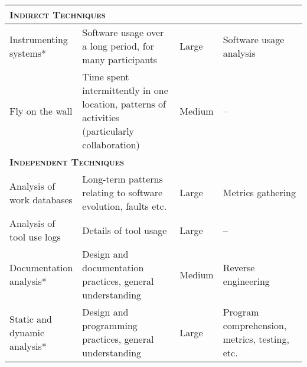 {\begin{landscape}
\begin{table}
{\begin{tabular}{p{0.2\linewidth}|p{0.375\linewidth}p{0.125\linewidth}p{0.3\linewidth}}
\midrule
\multicolumn{4}{l}{\textsc{\textbf{Indirect Techniques}}}\\
\midrule

Instrumenting systems* &
Software usage over a long period, for many participants &
Large &
Software usage analysis \\

Fly on the wall &
Time spent intermittently in one location, patterns of activities (particularly collaboration) &
Medium &
-- \\

\midrule
\multicolumn{4}{l}{\textsc{\textbf{Independent Techniques}}}\\
\midrule

Analysis of work databases &
Long-term patterns relating to software evolution, faults etc. &
Large &
Metrics gathering \\

Analysis of tool use logs &
Details of tool usage &
Large &
-- \\

Documentation analysis* &
Design and documentation practices, general understanding &
Medium &
Reverse engineering \\

Static and dynamic analysis* &
Design and programming practices, general understanding &
Large &
Program comprehension, metrics, testing, etc. \\

\bottomrule

\end{tabular}}
\end{table}\end{landscape}}